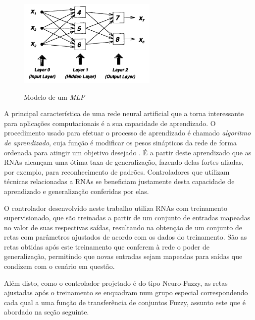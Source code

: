 \begin{figure}[!htb]
    \centering
    \caption{Modelo de um \textit{MLP}}
    \includegraphics[width=0.6\textwidth]{./04-figuras/fund_teorica/rna}
    \label{fig:rna}
\end{figure}

A principal característica de uma rede neural artificial que a torna interessante para aplicações computacionais é a sua capacidade de aprendizado. O procedimento usado para efetuar o processo de aprendizado é chamado \textit{algoritmo de aprendizado}, cuja função é modificar os pesos sinápticos da rede de forma ordenada para atingir um objetivo desejado \cite[p.~24]{Haykin1998}. É a partir deste aprendizado que as RNAs alcançam uma ótima taxa de generalização, fazendo delas fortes aliadas, por exemplo, para reconhecimento de padrões. Controladores que utilizam técnicas relacionadas a RNAs se beneficiam justamente desta capacidade de aprendizado e generalização conferidas por elas.

O controlador desenvolvido neste trabalho utiliza RNAs com treinamento supervisionado, que são treinadas a partir de um conjunto de entradas mapeadas no valor de suas respectivas saídas, resultando na obtenção de um conjunto de retas com parâmetros ajustados de acordo com os dados do treinamento. São as retas obtidas após este treinamento que conferem à rede o poder de generalização, permitindo que novas entradas sejam mapeadas para saídas que condizem com o cenário em questão.

Além disto, como o controlador projetado é do tipo Neuro-Fuzzy, as retas ajustadas após o treinamento se enquadram num grupo especial correspondendo cada qual a uma função de transferência de conjuntos Fuzzy, assunto este que é abordado na seção seguinte.




